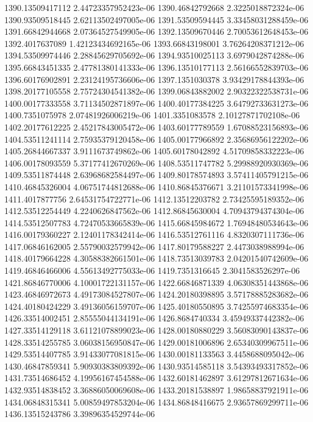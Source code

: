 {1390.13509417112 2.44723357952423e-06
1390.46842792668 2.3225018872324e-06
1390.93509518445 2.62113502497005e-06
1391.53509594445 3.33458031288459e-06
1391.66842944668 2.07364527549905e-06
1392.13509670446 2.70053612648453e-06
1392.4017637089 1.42123434692165e-06
1393.66843198001 3.76264208371212e-06
1394.53509974446 2.28845629705692e-06
1394.93510025113 3.6979042874288e-06
1395.66843451335 2.47781380141333e-06
1396.13510177113 2.56166552839703e-06
1396.60176902891 2.23124195736606e-06
1397.1351030378 3.93429178844393e-06
1398.20177105558 2.75724304541382e-06
1399.06843882002 2.90322322538731e-06
1400.00177333558 3.71134502871897e-06
1400.40177384225 3.64792733631273e-06
1400.7351075978 2.07481926006219e-06
1401.3351083578 2.10127871702108e-06
1402.20177612225 2.45217843005472e-06
1403.60177789559 1.67088523156893e-06
1404.53511241114 2.75935379120458e-06
1405.00177966892 2.35686956122202e-06
1405.26844667337 3.9111673749862e-06
1405.60178042892 4.51709858332223e-06
1406.00178093559 5.37177412670269e-06
1408.53511747782 5.29988920930369e-06
1409.53511874448 2.63968682584497e-06
1409.80178574893 3.57411405791215e-06
1410.46845326004 4.06751744812688e-06
1410.86845376671 3.21101573341998e-06
1411.4017877756 2.64531754722771e-06
1412.13512203782 2.73425595189352e-06
1412.53512254449 4.2240626847562e-06
1412.86845630004 4.70943794374304e-06
1414.53512507783 4.72470533665839e-06
1415.66845984672 1.76948480534643e-06
1416.00179360227 2.12401178342414e-06
1416.53512761116 4.8320307111736e-06
1417.06846162005 2.55790032579942e-06
1417.80179588227 2.4473038988994e-06
1418.40179664228 4.30588382661501e-06
1418.73513039783 2.04201540742609e-06
1419.46846466006 4.55613492775033e-06
1419.7351316645 2.3041583526297e-06
1421.86846770006 4.10001722131157e-06
1422.66846871339 4.06308351443868e-06
1423.46846972673 4.49173084527807e-06
1424.20180398895 3.57178885283682e-06
1424.40180424229 3.49136056159707e-06
1425.40180550895 3.74255974683354e-06
1426.33514002451 2.85555044134191e-06
1426.8684740334 3.45949337442382e-06
1427.33514129118 3.61121078899023e-06
1428.00180880229 3.56083090143837e-06
1428.33514255785 3.06038156950847e-06
1429.00181006896 2.65340309967511e-06
1429.53514407785 3.91433077081815e-06
1430.00181133563 3.4458688095042e-06
1430.46847859341 5.90930383809392e-06
1430.93514585118 3.54393493317852e-06
1431.73514686452 4.19956167454588e-06
1432.60181462897 3.61297812671634e-06
1432.93514838452 3.36886050069608e-06
1433.20181538897 1.98658837921911e-06
1434.06848315341 5.00859497853204e-06
1434.86848416675 2.93657869299711e-06
1436.13515243786 3.39896354529744e-06
}
